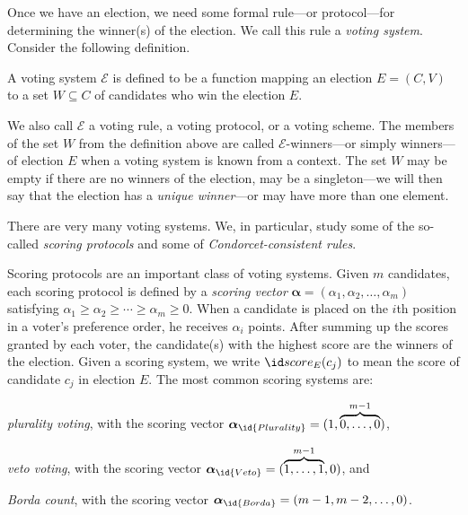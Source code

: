 Once we have an election, we need some formal rule---or protocol---for determining the winner(s) of the election.
We call this rule a \emph{voting system}.
Consider the following definition.

\begin{definition}
A voting system $\mathcal{E}$ is defined to be a function mapping an election $E=(C,V)$ to a set $W\subseteq C$ of candidates who win the election $E$.
\end{definition}

We also call $\mathcal{E}$ a voting rule, a voting protocol, or a voting scheme.
The members of the set $W$ from the definition above are called $\mathcal{E}$-winners---or simply winners---of election $E$ when a voting system is known from a context.
The set $W$ may be empty if there are no winners of the election, may be a singleton---we will then say that the election has a \emph{unique winner}---or may have more than one element.

There are very many voting systems.
We, in particular, study some of the so-called \emph{scoring protocols} and some of \emph{Condorcet-consistent rules}.

Scoring protocols are an important class of voting systems.
Given $m$ candidates, each scoring protocol is defined by a \emph{scoring vector} $\boldsymbol\alpha=(\alpha_1,\alpha_2,\dots,\alpha_m)$ satisfying $\alpha_1\ge\alpha_2\ge\cdots\ge\alpha_m\ge0$.
When a candidate is placed on the $i$th position in a voter's preference order, he receives $\alpha_i$ points.
After summing up the scores granted by each voter, the candidate(s) with the highest score are the winners of the election.
Given a scoring system, we write $\score{E}(c_j)$ to mean the score of candidate $c_j$ in election $E$.
The most common scoring systems are:
\begin{Enumerate}
	\item \emph{plurality voting}, with the scoring vector $\boldsymbol\alpha_{\id{Plurality}}=(1,\overbrace{0,\dots,0}^{m-1})$,
	\item \emph{veto voting}, with the scoring vector $\boldsymbol\alpha_{\id{Veto}}=(\overbrace{1,\dots,1}^{m-1},0)$, and
	\item \emph{Borda count}, with the scoring vector $\boldsymbol\alpha_{\id{Borda}}=(m-1,m-2,\dots,0)$.
\end{Enumerate}

